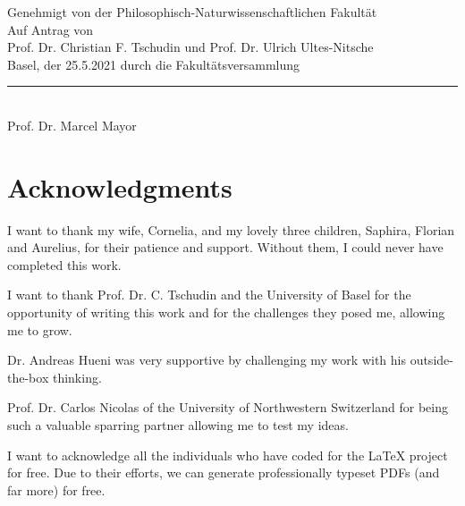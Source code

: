 \onecolumn
\clearpage\pagestyle{plain}

\begin{center}

Genehmigt von der Philosophisch-Naturwissenschaftlichen Fakult\"at\\
Auf Antrag von\\[0.5cm]
Prof. Dr. Christian F. Tschudin und Prof. Dr. Ulrich Ultes-Nitsche\\[0.5cm]

Basel, der 25.5.2021 durch die Fakultätsversammlung\\[2cm]
{\rule{6cm}{0.2pt}\\ Prof. Dr. Marcel Mayor}
\end{center}
\clearpage



\section*{\abstractname}   
\myabstract

\vspace*{\fill}

\section*{Acknowledgments}
I want to thank my wife, Cornelia, and my lovely three children, Saphira, Florian and Aurelius, for their patience and support. Without them, I could never have completed this work.

I want to thank Prof. Dr. C. Tschudin and the University of Basel for the opportunity of writing this work and for the challenges they posed me, allowing me to grow. 

Dr. Andreas Hueni was very supportive by challenging my work with his outside-the-box thinking.

Prof. Dr. Carlos Nicolas of the University of Northwestern Switzerland for being such a valuable sparring partner allowing me to test my ideas.

I want to acknowledge all the individuals who have coded for the \LaTeX{} project for free. Due to their efforts, we can generate professionally typeset PDFs (and far more) for free.






